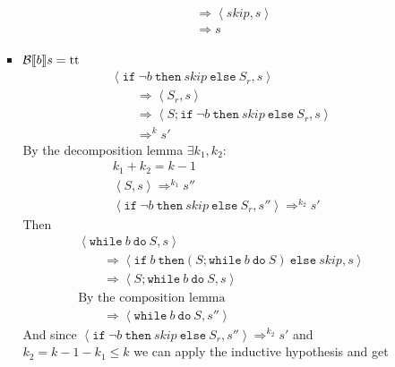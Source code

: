 \begin{exercise}
\begin{itemize}
\begin{itemize}
\begin{itemize}
\begin{gather*}
\begin{align*}
                            \\&\qquad\Rightarrow \left<skip, s\right>
                            \\&\qquad\Rightarrow s
                        \end{align*}
                    \end{gather*}
                    \item $\mathcal{B} \llbracket  b \rrbracket s = \text{tt}$
                    \begin{align*}
                        &\left<\texttt{if}\ \neg b\ \texttt{then}\ skip\ \texttt{else}\ S_r, s\right>
                        \\&\qquad\Rightarrow \left<S_r, s\right>
                        \\&\qquad\Rightarrow \left<S; \texttt{if}\ \neg b\ \texttt{then}\ skip\ \texttt{else}\ S_r, s\right>
                        \\&\qquad\Rightarrow^k s'
                    \end{align*}
                    By the decomposition lemma $\exists k_1, k_2 :$
                    \begin{gather*}
                        k_1 + k_2 = k - 1 \\
                        \left<S, s\right> \Rightarrow^{k_1} s'' \\
                        \left<\texttt{if}\ \neg b\ \texttt{then}\ skip\ \texttt{else}\ S_r, s''\right> \Rightarrow^{k_2} s'
                    \end{gather*}
                    Then
                    \begin{align*}
                        &\left<\texttt{while}\ b\ \texttt{do}\ S, s\right>
                        \\&\qquad\Rightarrow \left<\texttt{if}\ b\ \texttt{then} (S; \texttt{while}\ b\ \texttt{do}\ S)\ \texttt{else}\ skip, s\right>
                        \\&\qquad\Rightarrow \left<S; \texttt{while}\ b\ \texttt{do}\ S, s\right>
                        \\&\text{By the composition lemma}
                        \\&\qquad\Rightarrow \left<\texttt{while}\ b\ \texttt{do}\ S, s''\right>
                    \end{align*}
                    And since $\left<\texttt{if}\ \neg b\ \texttt{then}\ skip\ \texttt{else}\ S_r, s''\right> \Rightarrow^{k_2} s'$ and $k_2 = k - 1 - k_1 \leq k$  we can apply the inductive hypothesis and get

\end{itemize}
\end{itemize}
\end{itemize}
\end{exercise}
